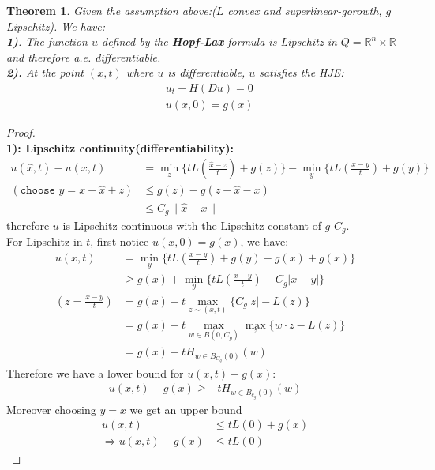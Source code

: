 \documentclass[a4paper,11pt,oneside,fleqn]{book}
\newtheorem{theorem}{Theorem}[section]
\theoremstyle{definition}
\theoremstyle{remark}
\begin{document}
\begin{theorem} Given the assumption above:($L$ convex and superlinear-gorowth, $g$ Lipschitz). We have:\\
 \textbf{1)}. The function $u$ defined by the \textbf{Hopf-Lax} formula is Lipschitz in $ Q =\mathbb{R}^n \times \mathbb{R}^+$ and therefore a.e. differentiable. \\
\textbf{2).} At the point $(x, t)$ where $u$ is differentiable, $u$ satisfies the HJE:
		\begin{align*}
			&u_t + H(Du) = 0\\
			&u(x, 0) = g(x)
		\end{align*}

\end{theorem}
\begin{proof}\quad\\
	\textbf{1): Lipschitz continuity(differentiability):} 
	\begin{align*}
		u(\hat{x}, t) - u(x, t) &= \min_z \{ t L(\frac{\hat{x} - z}{t}) + g(z)\} - \min_y\{tL(\frac{x - y}{t}) + g(y)\}\\
		(\texttt{choose } y = x - \hat{x} + z)
		&\le g(z) - g(z + \hat{x} - x)\\
		&\le C_g \|\hat{x} - x \|
	\end{align*}
	therefore $u$ is Lipschitz continuous with the Lipschitz constant of $g$ $C_g$.  \\
	For Lipschitz in $t$, first notice $u(x, 0) = g(x)$, we have:
	\begin{align*}
		u(x, t) &= \min_{y}\bigg\{tL(\frac{x - y}{t}) + g(y) - g(x) + g(x) \bigg\}\\
		&\ge  g(x) +  \min_y \bigg\{ tL(\frac{x - y}{t})  -C_g|x - y|\bigg\}\\
		(z = \frac{x - y}{t})
		&= g(x) - t\max_{z \sim (x, t)} \bigg\{ C_g |z| - L(z)\bigg\}\\
		&= g(x) - t\max_{w \in B(0, C_g)} \max_z \{ w \cdot z - L(z)\}\\
		&= g(x) - t H_{w \in B_{C_g}(0)}(w)
	\end{align*}
	Therefore we have a lower bound for $u(x, t) - g(x)$:
	\begin{align*}
		u(x, t) - g(x) \ge -t H_{w \in B_{c_g}(0)} (w)
	\end{align*}
	Moreover choosing $y= x$ we get an upper bound
	\begin{align*}
		u(x, t) &\le  tL(0) + g(x)\\
		\Rightarrow u(x, t) - g(x) &\le t L(0)
	\end{align*}

\end{proof}
\end{document}

